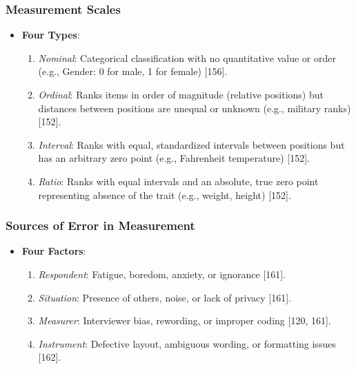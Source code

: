 \documentclass[
]{article}
\providecommand{\tightlist}{%
  \setlength{\itemsep}{0pt}\setlength{\parskip}{0pt}}
\begin{document}
\subsubsection{Measurement Scales}\label{measurement-scales}

\begin{itemize}
\tightlist
\item
  \textbf{Four Types}:

  \begin{enumerate}
  \def\labelenumi{\arabic{enumi}.}
  \tightlist
  \item
    \emph{Nominal}: Categorical classification with no quantitative
    value or order (e.g., Gender: 0 for male, 1 for female) {[}156{]}.
  \item
    \emph{Ordinal}: Ranks items in order of magnitude (relative
    positions) but distances between positions are unequal or unknown
    (e.g., military ranks) {[}152{]}.
  \item
    \emph{Interval}: Ranks with equal, standardized intervals between
    positions but has an arbitrary zero point (e.g., Fahrenheit
    temperature) {[}152{]}.
  \item
    \emph{Ratio}: Ranks with equal intervals and an absolute, true zero
    point representing absence of the trait (e.g., weight, height)
    {[}152{]}.
  \end{enumerate}
\end{itemize}

\subsubsection{Sources of Error in
Measurement}\label{sources-of-error-in-measurement}

\begin{itemize}
\tightlist
\item
  \textbf{Four Factors}:

  \begin{enumerate}
  \def\labelenumi{\arabic{enumi}.}
  \tightlist
  \item
    \emph{Respondent}: Fatigue, boredom, anxiety, or ignorance
    {[}161{]}.
  \item
    \emph{Situation}: Presence of others, noise, or lack of privacy
    {[}161{]}.
  \item
    \emph{Measurer}: Interviewer bias, rewording, or improper coding
    {[}120, 161{]}.
  \item
    \emph{Instrument}: Defective layout, ambiguous wording, or
    formatting issues {[}162{]}.
  \end{enumerate}
\end{itemize}
\end{document}
